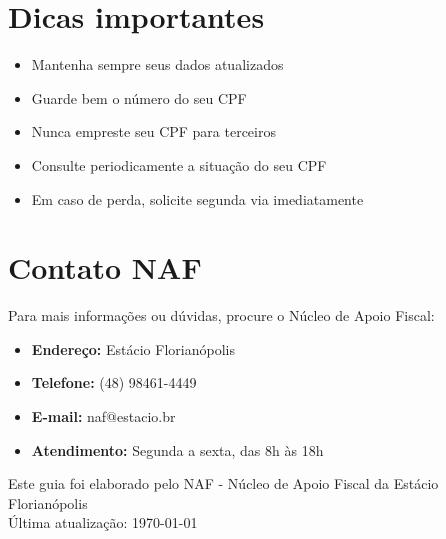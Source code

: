 \documentclass[12pt,a4paper]{article}
\begin{document}
\section{Dicas importantes}

\begin{itemize}
    \item Mantenha sempre seus dados atualizados
    \item Guarde bem o número do seu CPF
    \item Nunca empreste seu CPF para terceiros
    \item Consulte periodicamente a situação do seu CPF
    \item Em caso de perda, solicite segunda via imediatamente
\end{itemize}

\section{Contato NAF}

Para mais informações ou dúvidas, procure o Núcleo de Apoio Fiscal:

\begin{itemize}
    \item \textbf{Endereço:} Estácio Florianópolis
    \item \textbf{Telefone:} (48) 98461-4449
    \item \textbf{E-mail:} naf@estacio.br
    \item \textbf{Atendimento:} Segunda a sexta, das 8h às 18h
\end{itemize}

\vfill
\begin{center}
\footnotesize
Este guia foi elaborado pelo NAF - Núcleo de Apoio Fiscal da Estácio Florianópolis\\
Última atualização: \today
\end{center}
\end{document}
